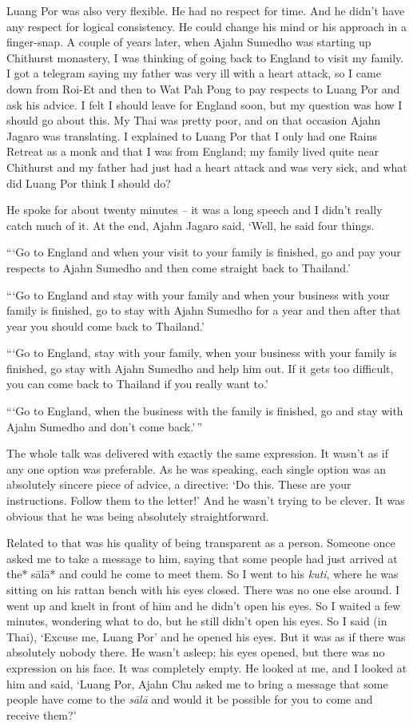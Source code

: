 Luang Por was also very flexible. He had no respect for time. And he
didn't have any respect for logical consistency. He could change his
mind or his approach in a finger-snap. A couple of years later, when
Ajahn Sumedho was starting up Chithurst monastery, I was thinking of
going back to England to visit my family. I got a telegram saying my
father was very ill with a heart attack, so I came down from Roi-Et and
then to Wat Pah Pong to pay respects to Luang Por and ask his advice. I
felt I should leave for England soon, but my question was how I should
go about this. My Thai was pretty poor, and on that occasion Ajahn
Jagaro was translating. I explained to Luang Por that I only had one
Rains Retreat as a monk and that I was from England; my family lived
quite near Chithurst and my father had just had a heart attack and was
very sick, and what did Luang Por think I should do?

He spoke for about twenty minutes -- it was a long speech and I didn't
really catch much of it. At the end, Ajahn Jagaro said, `Well, he said
four things.

```Go to England and when your visit to your family is finished, go and
pay your respects to Ajahn Sumedho and then come straight back to
Thailand.'

```Go to England and stay with your family and when your business with
your family is finished, go to stay with Ajahn Sumedho for a year and
then after that year you should come back to Thailand.'

```Go to England, stay with your family, when your business with your
family is finished, go stay with Ajahn Sumedho and help him out. If it
gets too difficult, you can come back to Thailand if you really want
to.'

```Go to England, when the business with the family is finished, go
and stay with Ajahn Sumedho and don't come back.'\,''

The whole talk was delivered with exactly the same expression. It wasn't
as if any one option was preferable. As he was speaking, each single
option was an absolutely sincere piece of advice, a directive: `Do this.
These are your instructions. Follow them to the letter!' And he wasn't
trying to be clever. It was obvious that he was being absolutely
straightforward.

Related to that was his quality of being transparent as a person.
Someone once asked me to take a message to him, saying that some people
had just arrived at the* sālā* and could he come to meet them. So I went
to his \emph{kuti}, where he was sitting on his rattan bench with his
eyes closed. There was no one else around. I went up and knelt in front
of him and he didn't open his eyes. So I waited a few minutes, wondering
what to do, but he still didn't open his eyes. So I said (in Thai),
`Excuse me, Luang Por' and he opened his eyes. But it was as if there
was absolutely nobody there. He wasn't asleep; his eyes opened, but
there was no expression on his face. It was completely empty. He looked
at me, and I looked at him and said, `Luang Por, Ajahn Chu asked me to
bring a message that some people have come to the \emph{sālā} and would
it be possible for you to come and receive them?'

